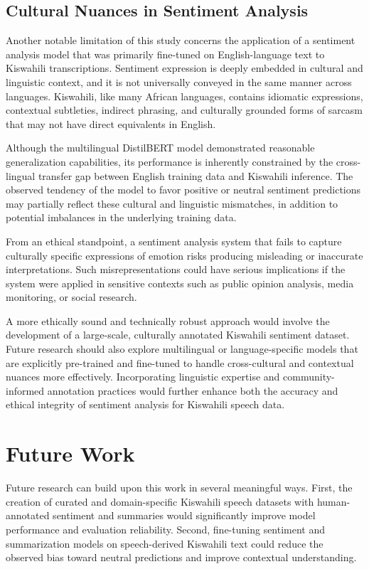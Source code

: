 \subsection{Cultural Nuances in Sentiment Analysis}

Another notable limitation of this study concerns the application of a sentiment analysis model that was primarily fine-tuned on English-language text to Kiswahili transcriptions. Sentiment expression is deeply embedded in cultural and linguistic context, and it is not universally conveyed in the same manner across languages. Kiswahili, like many African languages, contains idiomatic expressions, contextual subtleties, indirect phrasing, and culturally grounded forms of sarcasm that may not have direct equivalents in English.

Although the multilingual DistilBERT model demonstrated reasonable generalization capabilities, its performance is inherently constrained by the cross-lingual transfer gap between English training data and Kiswahili inference. The observed tendency of the model to favor positive or neutral sentiment predictions may partially reflect these cultural and linguistic mismatches, in addition to potential imbalances in the underlying training data.

From an ethical standpoint, a sentiment analysis system that fails to capture culturally specific expressions of emotion risks producing misleading or inaccurate interpretations. Such misrepresentations could have serious implications if the system were applied in sensitive contexts such as public opinion analysis, media monitoring, or social research.

A more ethically sound and technically robust approach would involve the development of a large-scale, culturally annotated Kiswahili sentiment dataset. Future research should also explore multilingual or language-specific models that are explicitly pre-trained and fine-tuned to handle cross-cultural and contextual nuances more effectively. Incorporating linguistic expertise and community-informed annotation practices would further enhance both the accuracy and ethical integrity of sentiment analysis for Kiswahili speech data.


\section{Future Work}

Future research can build upon this work in several meaningful ways. First, the creation of curated and domain-specific Kiswahili speech datasets with human-annotated sentiment and summaries would significantly improve model performance and evaluation reliability. Second, fine-tuning sentiment and summarization models on speech-derived Kiswahili text could reduce the observed bias toward neutral predictions and improve contextual understanding.

